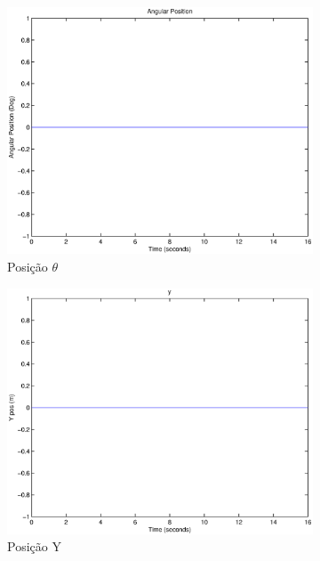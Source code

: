\documentclass{article}
\begin{document}
\begin{figure}[H]
	\centering
	\begin{subfigure}{0.45\textwidth}
		\includegraphics[width=\linewidth]{matlab/theta9}
		\caption{Posição $\theta$}
	\end{subfigure}
	\begin{subfigure}{0.45\textwidth}
		\includegraphics[width=\linewidth]{matlab/y9}
		\caption{Posição Y}
	\end{subfigure}
	\begin{subfigure}{0.45\textwidth}

\end{subfigure}
\end{figure}
\end{document}
